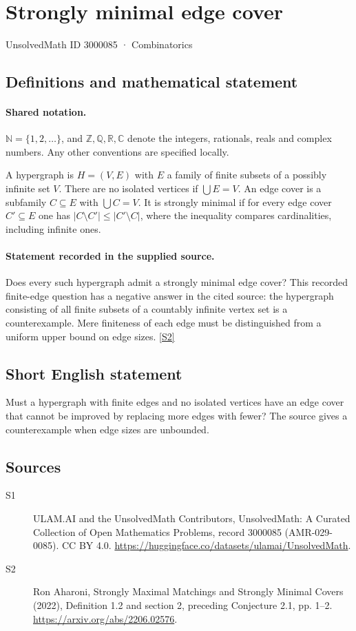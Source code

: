 \documentclass[11pt]{article}
\newcommand{\sref}[2]{\hyperlink{source:#1:#2}{[S#2]}}
\begin{document}
\setcounter{section}{3000084}
\section{Strongly minimal edge cover}\label{3000085}
{\small\sffamily UnsolvedMath ID 3000085 · Combinatorics}
\subsection{Definitions and mathematical statement}

\paragraph{Shared notation.}$\mathbb N=\{1,2,\ldots\}$, and $\mathbb Z,\mathbb Q,\mathbb R,\mathbb C$ denote the integers, rationals, reals and complex numbers. Any other conventions are specified locally.


A hypergraph is $H=(V,E)$ with $E$ a family of finite subsets of a possibly infinite set $V$. There are no isolated vertices if $\bigcup E=V$. An edge cover is a subfamily $C\subseteq E$ with $\bigcup C=V$. It is strongly minimal if for every edge cover $C'\subseteq E$ one has $|C\setminus C'|\leq|C'\setminus C|$, where the inequality compares cardinalities, including infinite ones.
\paragraph{Statement recorded in the supplied source.}
Does every such hypergraph admit a strongly minimal edge cover? This recorded finite-edge question has a negative answer in the cited source: the hypergraph consisting of all finite subsets of a countably infinite vertex set is a counterexample. Mere finiteness of each edge must be distinguished from a uniform upper bound on edge sizes. \sref{3000085}{2}
\subsection{Short English statement}
Must a hypergraph with finite edges and no isolated vertices have an edge cover that cannot be improved by replacing more edges with fewer? The source gives a counterexample when edge sizes are unbounded.
\subsection{Sources}
\begin{description}
\item[\hypertarget{source:3000085:1}{S1}] ULAM.AI and the UnsolvedMath Contributors, UnsolvedMath: A Curated Collection of Open Mathematics Problems, record 3000085 (AMR-029-0085). CC BY 4.0. \url{https://huggingface.co/datasets/ulamai/UnsolvedMath}.
\item[\hypertarget{source:3000085:2}{S2}] Ron Aharoni, Strongly Maximal Matchings and Strongly Minimal Covers (2022), Definition 1.2 and section 2, preceding Conjecture 2.1, pp. 1--2. \url{https://arxiv.org/abs/2206.02576}.
\end{description}
\label{end:3000085}
\end{document}
